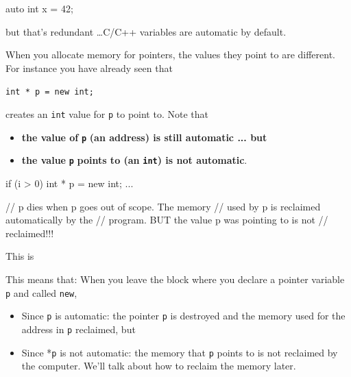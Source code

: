 \begin{consolethree}[escapeinside=||]
auto int x = 42;
\end{consolethree}

but that's redundant \ldots C/C++ variables are automatic by default.

When you allocate memory for pointers, the values they point to are different. For instance you have already seen that
\begin{center}
\texttt{int * p = new int;}
\end{center}

creates an \texttt{int} value for \texttt{p} to point to. Note that

\begin{itemize}
\item
  \textbf{the value of }\texttt{\textbf{p}}\textbf{ (an address) is still
  automatic ... but }
\item
  \textbf{the value }\texttt{\textbf{p}}\textbf{ points to (an
  }\texttt{\textbf{int}}\textbf{) is not automatic}.
\end{itemize}

\begin{consolethree}[escapeinside=||]
if (i > 0)
{
    int * p = new int;
    ...
}

// p dies when p goes out of scope. The memory
// used by p is reclaimed automatically by the
// program. BUT the value p was pointing to is not
// reclaimed!!! 
\end{consolethree}
This is 

This means that: When you leave the block where you declare a pointer variable \texttt{p} and called \texttt{new},

\begin{itemize}
\item
  Since \texttt{p} is automatic: the pointer \texttt{p} is destroyed and the
  memory used for the address in \texttt{p} reclaimed, but
\item
  Since *\texttt{p} is not automatic: the memory that \texttt{p} points to is not reclaimed by the computer. We'll talk about how to reclaim the memory later.
\end{itemize}

